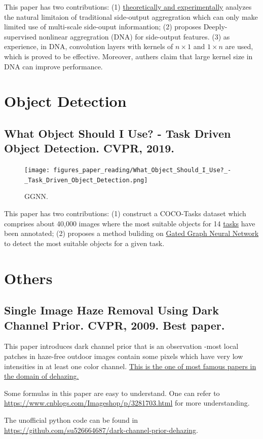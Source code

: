 \documentclass[10pt,onecolumn]{book}
\begin{document}
This paper has two contributions: 
(1) \uline{theoretically and experimentally} analyzes the natural limitaion of traditional side-output aggregration which can only make limited use of multi-scale side-ouput informantion; 
(2) proposes Deeply-supervised nonlinear aggregration (DNA) for side-output features. 
(3) as experience, in DNA, convolution layers with kernels of $n \times 1$ and $1 \times n$ are used, which is proved to be effective. Moreover, authers claim that large kernel size in DNA can improve performance.

\chapter{Object Detection}
\section{What Object Should I Use? - Task Driven Object Detection. CVPR, 2019.}
\begin{figure}[h]
\centering
\texttt{[image: figures\_paper\_reading/What\_Object\_Should\_I\_Use?\_-\_Task\_Driven\_Object\_Detection.png]}
\caption{GGNN.}
\label{fig}
\end{figure}

This paper has two contributions:
(1) construct a COCO-Tasks dataset which comprises about 40,000 images where the most suitable objects for 14 \uline{tasks} have been annotated;
(2) proposes a method buliding on \uline{Gated Graph Neural Network} to detect the most suitable objects for a given task. 

\chapter{Others}
\section{Single Image Haze Removal Using Dark Channel Prior. CVPR, 2009. Best paper.}
This paper introduces dark channel prior that is an observation -most local patches in haze-free outdoor images contain some pixels which have very low intensities in at least one color channel. \uline{This is the one of most famous papers in the domain of dehazing.} 

Some formulas in this paper are easy to understand. One can refer to \url{https://www.cnblogs.com/Imageshop/p/3281703.html} for more understanding. 

The unofficial python code can be found in \url{https://github.com/su526664687/dark-channel-prior-dehazing}.
\end{document}
